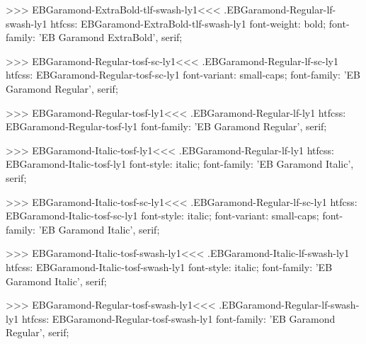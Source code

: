 {{>>>
\<EBGaramond-ExtraBold-tlf-swash-ly1\><<<
.EBGaramond-Regular-lf-swash-ly1
htfcss:  EBGaramond-ExtraBold-tlf-swash-ly1  font-weight: bold; font-family: 'EB Garamond ExtraBold', serif;

>>>
\<EBGaramond-Regular-tosf-sc-ly1\><<<
.EBGaramond-Regular-lf-sc-ly1
htfcss:  EBGaramond-Regular-tosf-sc-ly1  font-variant: small-caps; font-family: 'EB Garamond Regular', serif;

>>>
\<EBGaramond-Regular-tosf-ly1\><<<
.EBGaramond-Regular-lf-ly1
htfcss:  EBGaramond-Regular-tosf-ly1  font-family: 'EB Garamond Regular', serif;

>>>
\<EBGaramond-Italic-tosf-ly1\><<<
.EBGaramond-Regular-lf-ly1
htfcss:  EBGaramond-Italic-tosf-ly1  font-style: italic; font-family: 'EB Garamond Italic', serif;

>>>
\<EBGaramond-Italic-tosf-sc-ly1\><<<
.EBGaramond-Regular-lf-sc-ly1
htfcss:  EBGaramond-Italic-tosf-sc-ly1  font-style: italic; font-variant: small-caps; font-family: 'EB Garamond Italic', serif;

>>>
\<EBGaramond-Italic-tosf-swash-ly1\><<<
.EBGaramond-Italic-lf-swash-ly1
htfcss:  EBGaramond-Italic-tosf-swash-ly1  font-style: italic; font-family: 'EB Garamond Italic', serif;

>>>
\<EBGaramond-Regular-tosf-swash-ly1\><<<
.EBGaramond-Regular-lf-swash-ly1
htfcss:  EBGaramond-Regular-tosf-swash-ly1  font-family: 'EB Garamond Regular', serif;

}}
